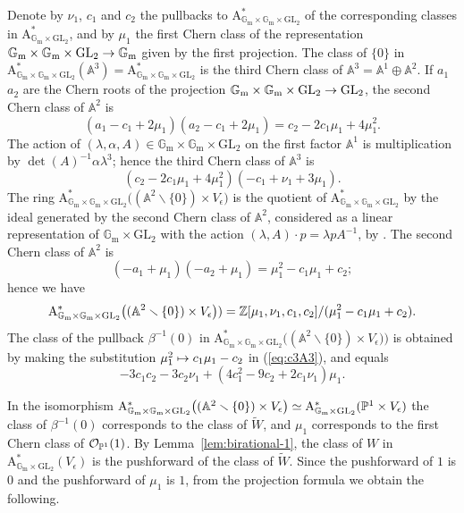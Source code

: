 \documentclass{amsart}
\numberwithin{equation}{section}
\numberwithin{subsection}{section}
\theoremstyle{definition}
\theoremstyle{remark}
\newcommand\cO{\mathcal{O}} \newcommand\cP{\mathcal{P}}
\renewcommand\AA{\mathbb{A}} \newcommand\BB{\mathbb{B}}
\newcommand\rA{\mathrm{A}} \newcommand\rB{\mathrm{B}}
\newcommand\arr{\ifinner\to\else\longrightarrow\fi}
\newcommand\arrto{\ifinner\mapsto\else\longmapsto\fi}
\renewcommand{\setminus}{\smallsetminus}
\newcommand{\GL}{\mathrm{GL}}
\newcommand{\gm}{\mathbb{G}_{\mathrm{m}}}
\newcommand\Ve{V_{\epsilon}}
\begin{document}
Denote by $\nu_{1}$, $c_{1}$ and $c_{2}$ the pullbacks to $\rA^*_{\gm \times \gm \times\GL_{2}}$ of the corresponding classes in $\rA^*_{\gm \times \GL_{2}}$, and by $\mu_{1}$ the first Chern class of the representation $\gm \times \gm \times \GL_{2} \arr \gm$ given by the first projection. The class of $\{0\}$ in $\rA^{*}_{\gm \times \gm \times \GL_{2}}(\AA^{3}) = \rA^{*}_{\gm \times \gm \times \GL_{2}}$ is the third Chern class of $\AA^{3} = \AA^{1} \oplus \AA^{2}$. If $a_{1}$ $a_{2}$ are the Chern roots of the projection $\gm \times \gm \times \GL_{2} \arr \GL_{2}$, the second Chern class of $\AA^{2}$ is
   \[
   (a_{1}-c_{1}+2\mu_{1})(a_{2}-c_{1}+2\mu_{1}) =
   c_{2} - 2c_{1}\mu_{1} + 4\mu_{1}^{2}.
   \]
The action of $(\lambda, \alpha, A) \in \gm \times \gm \times \GL_{2}$ on the first factor $\AA^{1}$ is multiplication by $\det(A)^{-1}\alpha\lambda^{3}$; hence the third Chern class of $\AA^{3}$ is
\begin{equation}\label{eq:c3A3}
(c_{2} - 2c_{1}\mu_{1} + 4\mu_{1}^{2})(-c_{1}+\nu_{1}+3\mu_{1}).
\end{equation}   
The ring $\rA^{*}_{\gm \times \gm \times \GL_{2}}\bigl((\AA^{2} \setminus \{0\})\times \Ve\bigr)$ is the quotient of $\rA^*_{\gm \times \gm \times \GL_{2}}$ by the ideal generated by the second Chern class of $\AA^{2}$, considered as a linear representation of $\gm\times \GL_{2}$ with the action $(\lambda, A) \cdot p = \lambda pA^{-1}$, by \cite[Lemma~2.2]{vismol}. The second Chern class of $\AA^{2}$ is 
   \[
   (-a_{1} + \mu_{1})(-a_{2} + \mu_{1}) = \mu_{1}^{2} - c_{1}\mu_{1} + c_{2};
   \]
hence we have
   \[
   \rA^*_{\gm \times \gm \times \GL_{2}}
      \bigl((\AA^{2} \setminus \{0\})\times \Ve\bigr))
   = \ZZ[\mu_{1}, \nu_{1}, c_{1}, c_{2}]/(\mu_{1}^{2} - c_{1}\mu_{1} + c_{2}).
   \]
The class of the pullback $\beta^{-1}(0)$ in $\rA^*_{\gm \times \gm \times \GL_{2}}\bigl((\AA^{2} \setminus \{0\})\times \Ve\bigr))$ is obtained by making the substitution $\mu_{1}^{2} \arrto c_{1}\mu_{1} - c_{2}$ in (\ref{eq:c3A3}), and equals
   \begin{equation}\label{eq:class-Wtilde}
   -3 c_1 c_2 - 3c_2\nu_1 + (4c_1^2 - 9c_2 + 2c_{1}\nu_1)\mu_1.
   \end{equation}

In the isomorphism $\rA^*_{\gm \times \gm \times \GL_{2}}\bigl((\AA^{2} \setminus \{0\})\times \Ve\bigr) \simeq \rA^*_{\gm \times \GL_{2}}(\PP^{1}\times \Ve)$ the class of $\beta^{-1}(0)$ corresponds to the class of $\widetilde{W}$, and $\mu_{1}$ corresponds to the first Chern class of $\cO_{\PP^{1}}(1)$. By Lemma~\ref{lem:birational-1}, the class of $W$ in $\rA^*_{\gm\times\GL_{2}}(\Ve)$ is the pushforward of the class of $\widetilde{W}$. Since the pushforward of $1$ is $0$ and the pushforward of $\mu_{1}$ is $1$, from the projection formula we obtain the following.
\end{document}
